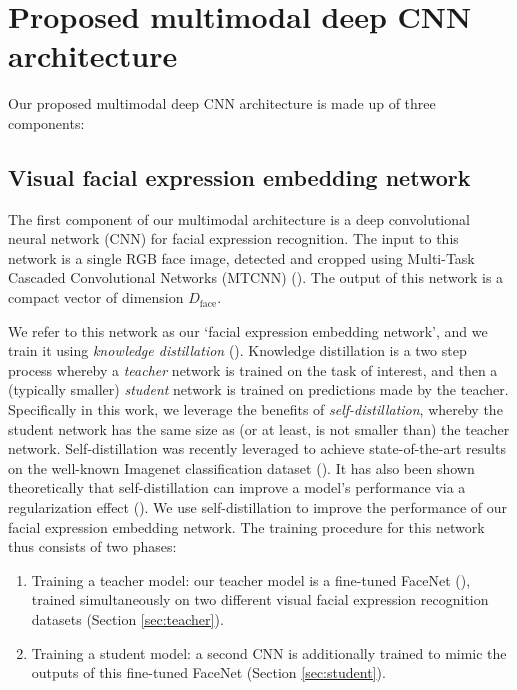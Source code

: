 \documentclass[times,twocolumn,final,authoryear]{elsarticle}
\begin{document}
	\section{Proposed multimodal deep CNN architecture}
	\label{sec:method}
	
	Our proposed multimodal deep CNN architecture is made up of three components:
	
	\subsection{Visual facial expression embedding network}
	\label{sec:cnn}
	
	The first component of our multimodal architecture is a deep convolutional neural network (CNN) for facial expression recognition. The input to this network is a single RGB face image, detected and cropped using Multi-Task Cascaded Convolutional Networks (MTCNN) (\cite{MTCNN}). The output of this network is a compact vector of dimension $D_{\text{face}}$.
	
	We refer to this network as our `facial expression embedding network', and we train it using \textit{knowledge distillation} (\cite{hinton2015}). Knowledge distillation is a two step process whereby a \textit{teacher} network is trained on the task of interest, and then a (typically smaller) \textit{student} network is trained on predictions made by the teacher. Specifically in this work, we leverage the benefits of \textit{self-distillation}, whereby the student network has the same size as (or at least, is not smaller than) the teacher network. Self-distillation was recently leveraged to achieve state-of-the-art results on the well-known Imagenet classification dataset (\cite{xie2020self}). It has also been shown theoretically that self-distillation can improve a model's performance via a regularization effect (\cite{mobahi2020self}). We use self-distillation to improve the performance of our facial expression embedding network. The training procedure for this network thus consists of two phases:
	\begin{enumerate}
		\item Training a teacher model: our teacher model is a fine-tuned FaceNet (\cite{Schroff2015}), trained simultaneously on two different visual facial expression recognition datasets (Section \ref{sec:teacher}).
		\item Training a student model: a second CNN is additionally trained to mimic the outputs of this fine-tuned FaceNet (Section \ref{sec:student}).
	\end{enumerate}
	
\end{document}
